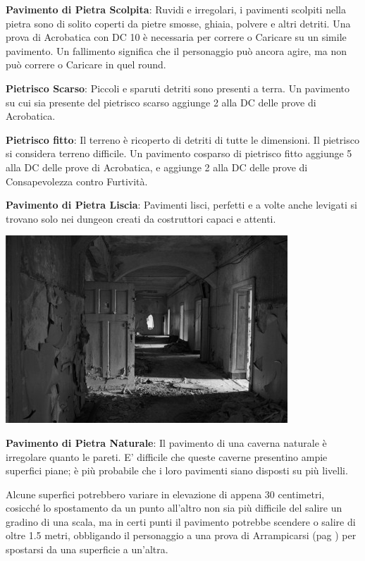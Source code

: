 \begin{multicols}{2}
\textbf{Pavimento di Pietra Scolpita}: Ruvidi e irregolari, i pavimenti scolpiti nella pietra sono di solito coperti da pietre smosse, ghiaia, polvere e altri detriti. Una prova di Acrobatica con DC 10 è necessaria per correre o Caricare su un simile pavimento. Un fallimento significa che il personaggio può ancora agire, ma non può correre o Caricare in quel round.

\textbf{Pietrisco Scarso}: Piccoli e sparuti detriti sono presenti a terra. Un pavimento su cui sia presente del pietrisco scarso aggiunge 2 alla DC delle prove di Acrobatica.

\textbf{Pietrisco fitto}: Il terreno è ricoperto di detriti di tutte le dimensioni. Il pietrisco si considera terreno difficile. Un pavimento cosparso di pietrisco fitto aggiunge 5 alla DC delle prove di Acrobatica, e aggiunge 2 alla DC delle prove di Consapevolezza contro Furtività.

\textbf{Pavimento di Pietra Liscia}: Pavimenti lisci, perfetti e a volte anche levigati si trovano solo nei dungeon creati da costruttori capaci e attenti.


\medskip

\begin{center}
	\includegraphics[width=0.9\linewidth]{immagini/pavimento_grey.png}
\end{center}

\medskip

\textbf{Pavimento di Pietra Naturale}: Il pavimento di una caverna naturale è irregolare quanto le pareti. E' difficile che queste caverne presentino ampie superfici piane; è più probabile che i loro pavimenti siano disposti su più livelli.

Alcune superfici potrebbero variare in elevazione di appena 30 centimetri, cosicché lo spostamento da un punto all'altro non sia più difficile del salire un gradino di una scala, ma in certi punti il pavimento potrebbe scendere o salire di oltre 1.5 metri, obbligando il personaggio a una prova di Arrampicarsi (pag \pageref{arrampicarsi}) per spostarsi da una superficie a un'altra.


\end{multicols}
